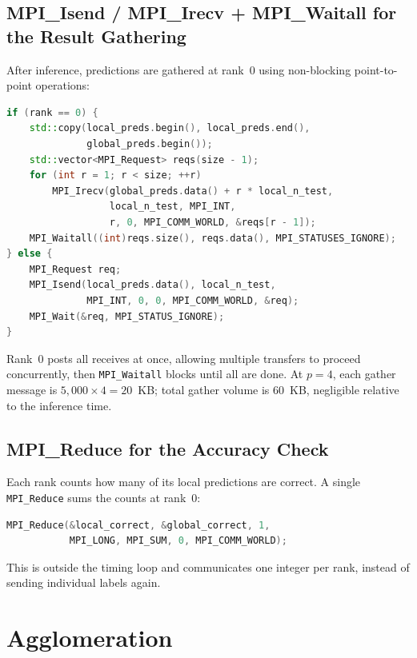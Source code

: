 \documentclass[12pt,a4paper]{article}
\begin{document}
\subsection{MPI\_Isend / MPI\_Irecv + MPI\_Waitall for the Result Gathering}

After inference, predictions are gathered at rank~0 using non-blocking
point-to-point operations:

\begin{lstlisting}[language=C++]
if (rank == 0) {
    std::copy(local_preds.begin(), local_preds.end(),
              global_preds.begin());
    std::vector<MPI_Request> reqs(size - 1);
    for (int r = 1; r < size; ++r)
        MPI_Irecv(global_preds.data() + r * local_n_test,
                  local_n_test, MPI_INT,
                  r, 0, MPI_COMM_WORLD, &reqs[r - 1]);
    MPI_Waitall((int)reqs.size(), reqs.data(), MPI_STATUSES_IGNORE);
} else {
    MPI_Request req;
    MPI_Isend(local_preds.data(), local_n_test,
              MPI_INT, 0, 0, MPI_COMM_WORLD, &req);
    MPI_Wait(&req, MPI_STATUS_IGNORE);
}
\end{lstlisting}

Rank~0 posts all receives at once, allowing multiple transfers to proceed
concurrently, then \texttt{MPI\_Waitall} blocks until all are done.
At $p=4$, each gather message is $5{,}000 \times 4 = 20$~KB; total gather
volume is 60~KB, negligible relative to the inference time.

\subsection{MPI\_Reduce for the Accuracy Check}

Each rank counts how many of its local predictions are correct.
A single \texttt{MPI\_Reduce} sums the counts at rank~0:

\begin{lstlisting}[language=C++]
MPI_Reduce(&local_correct, &global_correct, 1,
           MPI_LONG, MPI_SUM, 0, MPI_COMM_WORLD);
\end{lstlisting}

This is outside the timing loop and communicates one integer per rank,
instead of sending individual labels again.


\section{Agglomeration}
\label{sec:agglomeration}
\end{document}
